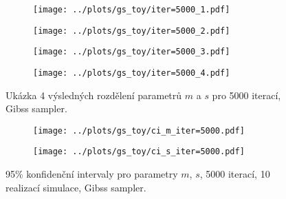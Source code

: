 \documentclass[11pt,oneside,american,czech]{article}
\begin{document}
\begin{figure}
	\centering
	\begin{subfigure}{0.45\textwidth}
		\centering
		\texttt{[image: ../plots/gs\_toy/iter=5000\_1.pdf]}
	\end{subfigure}
	\hspace{0.5cm}
	\begin{subfigure}{0.45\textwidth}
		\centering
		\texttt{[image: ../plots/gs\_toy/iter=5000\_2.pdf]}
	\end{subfigure}
	
	\vspace{2cm}
	
	\begin{subfigure}{0.45\textwidth}
		\centering
		\texttt{[image: ../plots/gs\_toy/iter=5000\_3.pdf]}
	\end{subfigure}
	\hspace{0.5cm}
	\begin{subfigure}{0.45\textwidth}
		\centering
		\texttt{[image: ../plots/gs\_toy/iter=5000\_4.pdf]}
	\end{subfigure}
	\caption{Ukázka 4 výsledných rozdělení parametrů $m$ a $s$ pro 5000 iterací, Gibss sampler.}
	\label{Obr: GS toy 5000}
\end{figure}

\begin{figure}
	\centering
	\begin{subfigure}{0.46\textwidth}
		\centering
		\texttt{[image: ../plots/gs\_toy/ci\_m\_iter=5000.pdf]}
	\end{subfigure}
	\hspace{0.5cm}
	\begin{subfigure}{0.46\textwidth}
		\centering
		\texttt{[image: ../plots/gs\_toy/ci\_s\_iter=5000.pdf]}
	\end{subfigure}
	\caption{95\% konfidenční intervaly pro parametry $m$, $s$, 5000 iterací, 10 realizací simulace, Gibss sampler.}
	\label{GS toy 5000 CI}
\end{figure}
\end{document}
